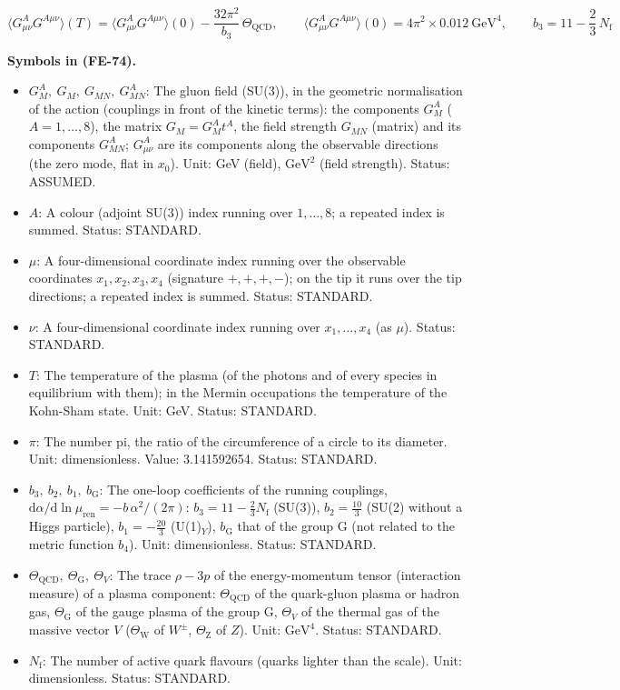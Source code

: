 \documentclass[
  10pt,
]{article}
\providecommand{\tightlist}{%
  \setlength{\itemsep}{0pt}\setlength{\parskip}{0pt}}
\begin{document}
\[
\big\langle G^A_{\mu\nu}G^{A\mu\nu}\big\rangle(T) = \big\langle G^A_{\mu\nu}G^{A\mu\nu}\big\rangle(0)
 - \frac{32\pi^2}{b_3}\,\Theta_{\mathrm{QCD}},\qquad
\big\langle G^A_{\mu\nu}G^{A\mu\nu}\big\rangle(0) = 4\pi^2\times0.012\ \text{GeV}^4,\qquad
b_3 = 11 - \frac23\,N_{\mathrm{f}} \tag{FE-74}
\]

\textbf{Symbols in (FE-74).}

\begin{itemize}
\tightlist
\item
  \(G^A_M,\ G_M,\ G_{MN},\ G^A_{MN}\): The gluon field (SU(3)), in the
  geometric normalisation of the action (couplings in front of the
  kinetic terms): the components \(G^A_M\) (\(A = 1, \dots, 8\)), the
  matrix \(G_M = G^A_Mt^A\), the field strength \(G_{MN}\) (matrix) and
  its components \(G^A_{MN}\); \(G^A_{\mu\nu}\) are its components along
  the observable directions (the zero mode, flat in \(x_0\)). Unit: GeV
  (field), \(\mathrm{GeV}^{2}\) (field strength). Status: ASSUMED.
\item
  \(A\): A colour (adjoint SU(3)) index running over \(1, \dots, 8\); a
  repeated index is summed. Status: STANDARD.
\item
  \(\mu\): A four-dimensional coordinate index running over the
  observable coordinates \(x_1, x_2, x_3, x_4\) (signature \(+,+,+,-\));
  on the tip it runs over the tip directions; a repeated index is
  summed. Status: STANDARD.
\item
  \(\nu\): A four-dimensional coordinate index running over
  \(x_1, \dots, x_4\) (as \(\mu\)). Status: STANDARD.
\item
  \(T\): The temperature of the plasma (of the photons and of every
  species in equilibrium with them); in the Mermin occupations the
  temperature of the Kohn-Sham state. Unit: GeV. Status: STANDARD.
\item
  \(\pi\): The number pi, the ratio of the circumference of a circle to
  its diameter. Unit: dimensionless. Value: 3.141592654. Status:
  STANDARD.
\item
  \(b_3,\ b_2,\ b_1,\ b_{\mathrm{G}}\): The one-loop coefficients of the
  running couplings,
  \(\mathrm{d}\alpha/\mathrm{d}\ln\mu_{\mathrm{ren}} = -b\,\alpha^2/(2\pi)\):
  \(b_3 = 11 - \frac23N_{\mathrm{f}}\) (SU(3)), \(b_2 = \frac{10}{3}\)
  (SU(2) without a Higgs particle), \(b_1 = -\frac{20}{3}\)
  (U(1)\(_Y\)), \(b_{\mathrm{G}}\) that of the group G (not related to
  the metric function \(b_4\)). Unit: dimensionless. Status: STANDARD.
\item
  \(\Theta_{\mathrm{QCD}},\ \Theta_{\mathrm{G}},\ \Theta_V\): The trace
  \(\rho - 3p\) of the energy-momentum tensor (interaction measure) of a
  plasma component: \(\Theta_{\mathrm{QCD}}\) of the quark-gluon plasma
  or hadron gas, \(\Theta_{\mathrm{G}}\) of the gauge plasma of the
  group G, \(\Theta_V\) of the thermal gas of the massive vector \(V\)
  (\(\Theta_{\mathrm{W}}\) of \(W^\pm\), \(\Theta_{\mathrm{Z}}\) of
  \(Z\)). Unit: \(\mathrm{GeV}^{4}\). Status: STANDARD.
\item
  \(N_{\mathrm{f}}\): The number of active quark flavours (quarks
  lighter than the scale). Unit: dimensionless. Status: STANDARD.
\end{itemize}
\end{document}
